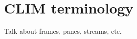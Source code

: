 \documentclass[11pt]{book}
\def\clim{CLIM}
\def\inputtex#1{}
\begin{document}
\inputtex{history.tex}
\inputtex{beaming-algo.tex}
\inputtex{accidentals.tex}
\inputtex{release-notes.tex}
\inputtex{plans.tex}

\chapter{{\clim} terminology}
\label{clim-terminology}

Talk about frames, panes, streams, etc.

\nocite{ross-1987} \nocite{haken-1993} \nocite{haken-1995}
\nocite{aho-hopcroft-ullman} \nocite{blostein-1991}
\nocite{blostein-1994} \nocite{gourlay-1987-spacing}
\nocite{gourlay-1987-formatting} \nocite{hegazy-1987}
\nocite{hegazy-1987-breaking} \nocite{rader-1996} \nocite{tex}


\printindex

\newpage


\end{document}
